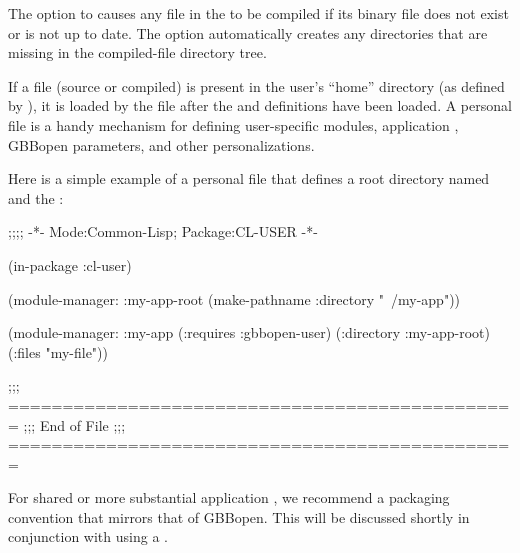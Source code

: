 \documentclass[10pt,twoside,english,pdftex]{article}
\begin{document}
%
%
%
The  option to 
causes any file in the  to be compiled if its binary
file does not exist or is not up to date.  The 
option automatically creates any directories that are missing in the
compiled-file directory tree.


%
%
%
%
%
%
If a  file (source or compiled) is present in
the user's ``home'' directory (as defined by
), it is loaded by the
 file after the
 and definitions have
been loaded.  A personal 
file is a handy mechanism for defining user-specific modules, application
, GBBopen parameters, and other personalizations.

Here is a simple example of a personal
 file that defines a root
directory named  and the 
:
%
\W\supp
\begin{example}
  ;;;; -*- Mode:Common-Lisp; Package:CL-USER -*-

  (in-package :cl-user)

  (module-manager: :my-app-root 
      (make-pathname :directory "~/my-app"))    

  (module-manager: :my-app
    (:requires :gbbopen-user)
    (:directory :my-app-root)
    (:files "my-file"))

  ;;; ===============================================
  ;;;   End of File
  ;;; ===============================================
\end{example}

For shared or more substantial application , we recommend a
packaging convention that mirrors that of GBBopen.  This will be discussed
shortly in conjunction with using a .
\end{document}
